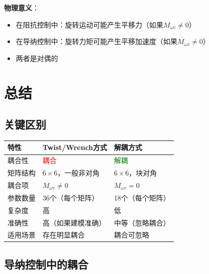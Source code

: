 \documentclass[12pt,a4paper]{article}
\begin{document}
\textbf{物理意义}：
\begin{itemize}
\item 在阻抗控制中：旋转运动可能产生平移力（如果$M_{\omega v} \neq 0$）
\item 在导纳控制中：旋转力矩可能产生平移加速度（如果$M_{\omega v} \neq 0$）
\item 两者是对偶的
\end{itemize}

\section{总结}

\subsection{关键区别}

\begin{center}
\begin{tabular}{|l|l|l|}
\hline
\textbf{特性} & \textbf{Twist/Wrench方式} & \textbf{解耦方式} \\
\hline
耦合性 & \textcolor{red}{耦合} & \textcolor{green}{解耦} \\
\hline
矩阵结构 & $6 \times 6$，一般非对角 & $6 \times 6$，块对角 \\
\hline
耦合项 & $M_{\omega v} \neq 0$ & $M_{\omega v} = 0$ \\
\hline
参数数量 & 36个（每个矩阵） & 18个（每个矩阵） \\
\hline
复杂度 & 高 & 低 \\
\hline
准确性 & 高（如果建模准确） & 中等（忽略耦合） \\
\hline
适用场景 & 存在明显耦合 & 耦合可忽略 \\
\hline
\end{tabular}
\end{center}

\subsection{导纳控制中的耦合}
\end{document}
